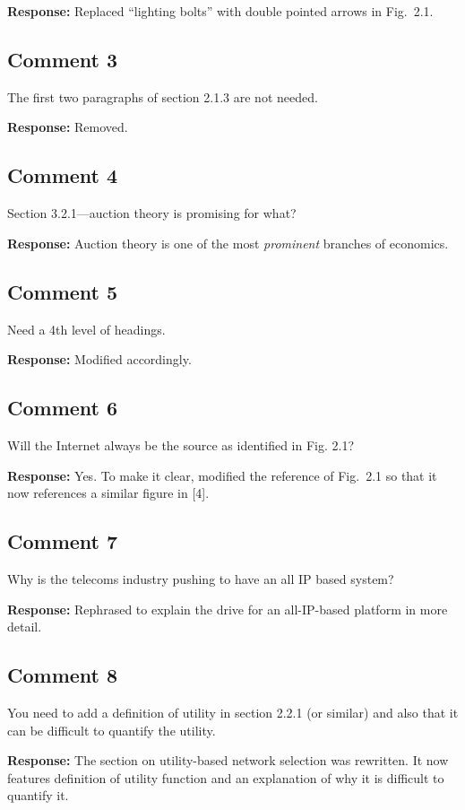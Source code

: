 \documentclass[10pt,a4paper,notitlepage]{article}
\numberwithin{equation}{section}
\begin{document}
\textbf{Response:}
Replaced ``lighting bolts'' with double pointed arrows in Fig.~2.1.

\subsection{Comment 3}
The first two paragraphs of section 2.1.3 are not needed.

\textbf{Response:}
Removed.

\subsection{Comment 4}
Section 3.2.1---auction theory is promising for what?

\textbf{Response:}
Auction theory is one of the most \emph{prominent} branches of economics.

\subsection{Comment 5}
Need a 4th level of headings.

\textbf{Response:}
Modified accordingly.

\subsection{Comment 6}
Will the Internet always be the source as identified in Fig. 2.1?

\textbf{Response:}
Yes. To make it clear, modified the reference of Fig.~2.1 so that it now references a similar figure in [4].

\subsection{Comment 7}
Why is the telecoms industry pushing to have an all IP based system?

\textbf{Response:}
Rephrased to explain the drive for an all-IP-based platform in more detail.

\subsection{Comment 8}
You need to add a definition of utility in section 2.2.1 (or similar) and also that it can be difficult to quantify the utility.

\textbf{Response:}
The section on utility-based network selection was rewritten. It now features definition of utility function and an explanation of why it is difficult to quantify it.
\end{document}
